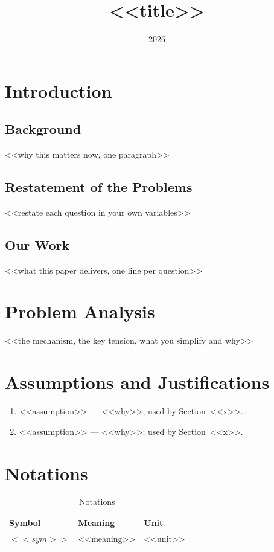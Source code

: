 \documentclass{swmcmthesis}
\title{<<title>>}
\date{2026}
\begin{document}
\maketitle
\tableofcontents
\newpage
\setcounter{page}{1}

\section{Introduction}
\subsection{Background}
<<why this matters now, one paragraph>>
\subsection{Restatement of the Problems}
<<restate each question in your own variables>>
\subsection{Our Work}
<<what this paper delivers, one line per question>>
\section{Problem Analysis}
<<the mechanism, the key tension, what you simplify and why>>
\section{Assumptions and Justifications}
\begin{enumerate}
  \item <<assumption>> --- <<why>>; used by Section~<<x>>.
  \item <<assumption>> --- <<why>>; used by Section~<<x>>.
\end{enumerate}
\section{Notations}
\begin{table}[htbp]\centering\caption{Notations}\label{tab:notation}
\begin{tabular}{@{}lll@{}}\toprule Symbol & Meaning & Unit \\ \midrule
$<<sym>>$ & <<meaning>> & <<unit>> \\ \bottomrule\end{tabular}\end{table}
\end{document}
